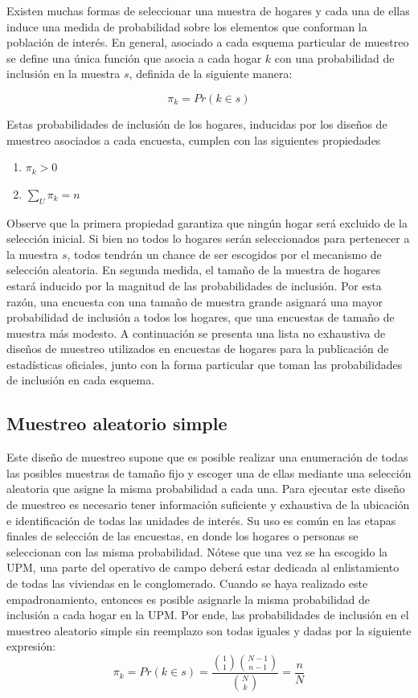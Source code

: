 Existen muchas formas de seleccionar una muestra de hogares y cada una de ellas induce una medida de probabilidad sobre los elementos que conforman la población de interés. En general, asociado a cada esquema particular de muestreo se define una única función que asocia a cada hogar \(k\) con una probabilidad de inclusión en la muestra \(s\), definida de la siguiente manera:

\[\pi_k = Pr (k \in s)\]

Estas probabilidades de inclusión de los hogares, inducidas por los diseños de muestreo asociados a cada encuesta, cumplen con las siguientes propiedades

\begin{enumerate}
\def\labelenumi{\arabic{enumi}.}
\tightlist
\item
  \(\pi_k > 0\)
\item
  \(\sum_U \pi_k = n\)
\end{enumerate}

Observe que la primera propiedad garantiza que ningún hogar será excluido de la selección inicial. Si bien no todos lo hogares serán seleccionados para pertenecer a la muestra \(s\), todos tendrán un chance de ser escogidos por el mecanismo de selección aleatoria. En segunda medida, el tamaño de la muestra de hogares estará inducido por la magnitud de las probabilidades de inclusión. Por esta razón, una encuesta con una tamaño de muestra grande asignará una mayor probabilidad de inclusión a todos los hogares, que una encuestas de tamaño de muestra más modesto. A continuación se presenta una lista no exhaustiva de diseños de muestreo utilizados en encuestas de hogares para la publicación de estadísticas oficiales, junto con la forma particular que toman las probabilidades de inclusión en cada esquema.

\hypertarget{muestreo-aleatorio-simple}{%
\subsection*{Muestreo aleatorio simple}\label{muestreo-aleatorio-simple}}


Este diseño de muestreo supone que es posible realizar una enumeración de todas las posibles muestras de tamaño fijo y escoger una de ellas mediante una selección aleatoria que asigne la misma probabilidad a cada una. Para ejecutar este diseño de muestreo es necesario tener información suficiente y exhaustiva de la ubicación e identificación de todas las unidades de interés. Su uso es común en las etapas finales de selección de las encuestas, en donde los hogares o personas se seleccionan con las misma probabilidad. Nótese que una vez se ha escogido la UPM, una parte del operativo de campo deberá estar dedicada al enlistamiento de todas las viviendas en le conglomerado. Cuando se haya realizado este empadronamiento, entonces es posible asignarle la misma probabilidad de inclusión a cada hogar en la UPM. Por ende, las probabilidades de inclusión en el muestreo aleatorio simple sin reemplazo son todas iguales y dadas por la siguiente expresión:
\[\pi_k = Pr(k \in s) =  \frac{\binom{1}{1}\binom{N-1}{n-1}}{\binom{N}{k}} = \frac{n}{N}\]

